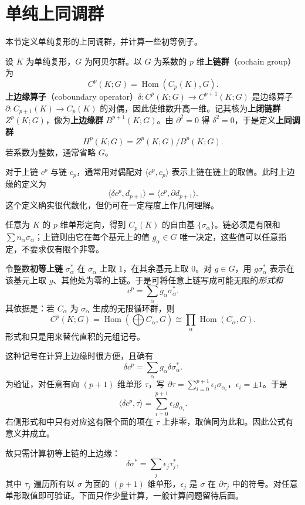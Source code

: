 \section{单纯上同调群}
本节定义单纯复形的上同调群，并计算一些初等例子。

设 $K$ 为单纯复形，$G$ 为阿贝尔群。以 $G$ 为系数的 $p$ 维\textbf{上链群}（cochain group）为
\[
C^p(K;G)=\operatorname{Hom}(C_p(K),G).
\]
\textbf{上边缘算子}（coboundary operator）$\delta:C^p(K;G)\to C^{p+1}(K;G)$ 是边缘算子 $\partial:C_{p+1}(K)\to C_p(K)$ 的对偶，因此使维数升高一维。记其核为\textbf{上闭链群} $Z^p(K;G)$，像为\textbf{上边缘群} $B^{p+1}(K;G)$。由 $\partial^2=0$ 得 $\delta^2=0$，于是定义\textbf{上同调群}
\[
H^p(K;G)=Z^p(K;G)/B^p(K;G).
\]
若系数为整数，通常省略 $G$。

对于上链 $c^p$ 与链 $c_p$，通常用对偶配对 $\langle c^p,c_p\rangle$ 表示上链在链上的取值。此时上边缘的定义为
\[
\langle\delta c^p,d_{p+1}\rangle=\langle c^p,\partial d_{p+1}\rangle.
\]
这个定义确实很代数化，但仍可在一定程度上作几何理解。

任意为 $K$ 的 $p$ 维单形定向，得到 $C_p(K)$ 的自由基 $\{\sigma_\alpha\}$。链必须是有限和 $\sum n_\alpha\sigma_\alpha$；上链则由它在每个基元上的值 $g_\alpha\in G$ 唯一决定，这些值可以任意指定，不要求仅有限个非零。

令整数\textbf{初等上链} $\sigma_\alpha^*$ 在 $\sigma_\alpha$ 上取 $1$，在其余基元上取 $0$。对 $g\in G$，用 $g\sigma_\alpha^*$ 表示在该基元上取 $g$、其他处为零的上链。于是可将任意上链写成可能无限的\emph{形式和}
\[
c^p=\sum_\alpha g_\alpha\sigma_\alpha^*.
\]
其依据是：若 $C_\alpha$ 为 $\sigma_\alpha$ 生成的无限循环群，则
\[
C^p(K;G)=\operatorname{Hom}(\bigoplus C_\alpha,G)
\cong\prod_\alpha\operatorname{Hom}(C_\alpha,G).
\]
形式和只是用来替代直积的元组记号。

这种记号在计算上边缘时很方便，且确有
\[
\delta c^p=\sum_\alpha g_\alpha\delta\sigma_\alpha^*.
\]
为验证，对任意有向 $(p+1)$ 维单形 $\tau$，写 $\partial\tau=\sum_{i=0}^{p+1}\epsilon_i\sigma_{\alpha_i}$，$\epsilon_i=\pm1$。于是
\[
\langle\delta c^p,\tau\rangle=\sum_{i=0}^{p+1}\epsilon_i g_{\alpha_i}.
\]
右侧形式和中只有对应这有限个面的项在 $\tau$ 上非零，取值同为此和。因此公式有意义并成立。

故只需计算初等上链的上边缘：
\[
\delta\sigma^*=\sum_j\epsilon_j\tau_j^*,
\]
其中 $\tau_j$ 遍历所有以 $\sigma$ 为面的 $(p+1)$ 维单形，$\epsilon_j$ 是 $\sigma$ 在 $\partial\tau_j$ 中的符号。对任意单形取值即可验证。下面只作少量计算，一般计算问题留待后面。

